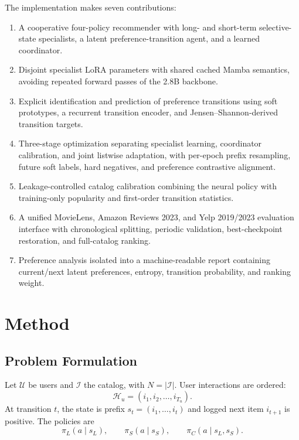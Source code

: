 \documentclass[11pt,a4paper]{article}
\begin{document}
The implementation makes seven contributions:
\begin{enumerate}
  \item A cooperative four-policy recommender with long- and short-term selective-state specialists, a latent preference-transition agent, and a learned coordinator.
  \item Disjoint specialist LoRA parameters with shared cached Mamba semantics,
  avoiding repeated forward passes of the 2.8B backbone.
  \item Explicit identification and prediction of preference transitions using soft prototypes, a recurrent transition encoder, and Jensen--Shannon-derived transition targets.
  \item Three-stage optimization separating specialist learning, coordinator
  calibration, and joint listwise adaptation, with per-epoch prefix resampling,
  future soft labels, hard negatives, and preference contrastive alignment.
  \item Leakage-controlled catalog calibration combining the neural policy with training-only popularity and first-order transition statistics.
  \item A unified MovieLens, Amazon Reviews 2023, and Yelp 2019/2023 evaluation interface with chronological splitting, periodic validation, best-checkpoint restoration, and full-catalog ranking.
  \item Preference analysis isolated into a machine-readable report containing current/next latent preferences, entropy, transition probability, and ranking weight.
\end{enumerate}



\section{Method}

\subsection{Problem Formulation}

Let $\mathcal U$ be users and $\mathcal I$ the catalog, with $N=|\mathcal I|$. User interactions are ordered:
\begin{equation}
  \mathcal H_u=(i_1,i_2,\ldots,i_{T_u}).
\end{equation}
At transition $t$, the state is prefix $s_t=(i_1,\ldots,i_t)$ and logged next item $i_{t+1}$ is positive. The policies are
\begin{equation}
  \pi_L(a\mid s_L),\qquad
  \pi_S(a\mid s_S),\qquad
  \pi_C(a\mid s_L,s_S).
\end{equation}
\end{document}
